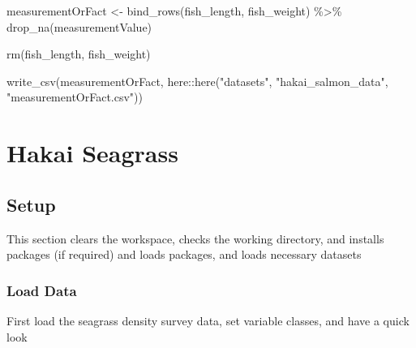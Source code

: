 \documentclass[
]{book}
\newenvironment{Shaded}{\begin{snugshade}}{\end{snugshade}}
\newcommand{\AttributeTok}[1]{\textcolor[rgb]{0.77,0.63,0.00}{#1}}
\newcommand{\CommentTok}[1]{\textcolor[rgb]{0.56,0.35,0.01}{\textit{#1}}}
\newcommand{\ConstantTok}[1]{\textcolor[rgb]{0.00,0.00,0.00}{#1}}
\newcommand{\FunctionTok}[1]{\textcolor[rgb]{0.00,0.00,0.00}{#1}}
\newcommand{\NormalTok}[1]{#1}
\newcommand{\OtherTok}[1]{\textcolor[rgb]{0.56,0.35,0.01}{#1}}
\newcommand{\SpecialCharTok}[1]{\textcolor[rgb]{0.00,0.00,0.00}{#1}}
\newcommand{\StringTok}[1]{\textcolor[rgb]{0.31,0.60,0.02}{#1}}
\begin{document}
\begin{Shaded}
\begin{Highlighting}[]
\NormalTok{measurementOrFact }\OtherTok{\textless{}{-}} \FunctionTok{bind\_rows}\NormalTok{(fish\_length, fish\_weight) }\SpecialCharTok{\%\textgreater{}\%} 
  \FunctionTok{drop\_na}\NormalTok{(measurementValue)}

\FunctionTok{rm}\NormalTok{(fish\_length, fish\_weight)}

\FunctionTok{write\_csv}\NormalTok{(measurementOrFact, here}\SpecialCharTok{::}\FunctionTok{here}\NormalTok{(}\StringTok{"datasets"}\NormalTok{, }\StringTok{"hakai\_salmon\_data"}\NormalTok{, }\StringTok{"measurementOrFact.csv"}\NormalTok{))}
\end{Highlighting}
\end{Shaded}

\hypertarget{hakai-seagrass}{%
\section{Hakai Seagrass}\label{hakai-seagrass}}

\hypertarget{setup}{%
\subsection{Setup}\label{setup}}

This section clears the workspace, checks the working directory, and
installs packages (if required) and loads packages, and loads necessary
datasets

\begin{Shaded}
\end{Shaded}

\hypertarget{load-data}{%
\subsubsection{Load Data}\label{load-data}}

First load the seagrass density survey data, set variable classes, and have a quick look
\end{document}
